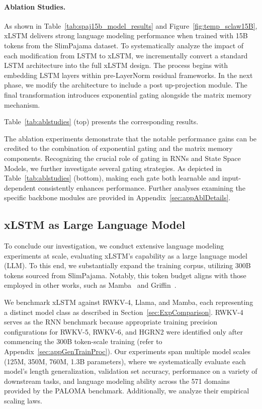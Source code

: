 \paragraph{Ablation Studies.}
As shown in Table~\ref{tab:spaj15b_model_results} and Figure~\ref{fig:temp_sclaw15B}, xLSTM delivers strong language modeling performance when trained with 15B tokens from the SlimPajama dataset. To systematically analyze the impact of each modification from LSTM to xLSTM, we incrementally convert a standard LSTM architecture into the full xLSTM design. The process begins with embedding LSTM layers within pre-LayerNorm residual frameworks. In the next phase, we modify the architecture to include a post up-projection module. The final transformation introduces exponential gating alongside the matrix memory mechanism.

Table~\ref{tab:ablstudies} (top) presents the corresponding results.

The ablation experiments demonstrate that the notable performance gains can be credited to the combination of exponential gating and the matrix memory components. Recognizing the crucial role of gating in RNNs and State Space Models, we further investigate several gating strategies. As depicted in Table~\ref{tab:ablstudies} (bottom), making each gate both learnable and input-dependent consistently enhances performance. Further analyses examining the specific backbone modules are provided in Appendix~\ref{sec:appAblDetails}.

\subsection{xLSTM as Large Language Model}
\label{sec:ExpLanguage}

To conclude our investigation, we conduct extensive language modeling experiments at scale, evaluating xLSTM's capability as a large language model (LLM). To this end, we substantially expand the training corpus, utilizing 300B tokens sourced from SlimPajama. Notably, this token budget aligns with those employed in other works, such as Mamba~\citep{Gu:24arxiv} and Griffin~\citep{De:24arxiv}.

We benchmark xLSTM against RWKV-4, Llama, and Mamba, each representing a distinct model class as described in Section~\ref{sec:ExpComparison}. RWKV-4 serves as the RNN benchmark because appropriate training precision configurations for RWKV-5, RWKV-6, and HGRN2 were identified only after commencing the 300B token-scale training (refer to Appendix~\ref{sec:appGenTrainProc}). Our experiments span multiple model scales (125M, 350M, 760M, 1.3B parameters), where we systematically evaluate each model’s length generalization, validation set accuracy, performance on a variety of downstream tasks, and language modeling ability across the 571 domains provided by the PALOMA benchmark. Additionally, we analyze their empirical scaling laws.

